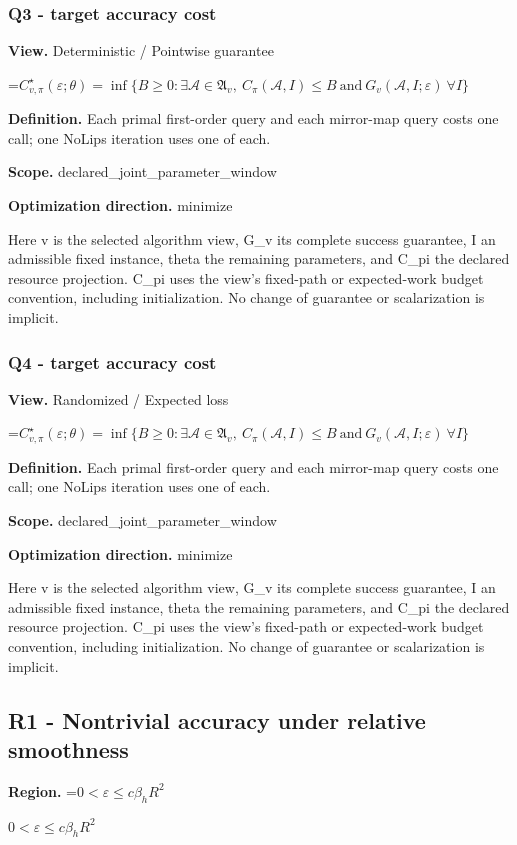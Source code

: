 \documentclass[10pt,a4paper]{article}
\newcommand{\AtlasMath}[1]{\par\begingroup\centering\setbox0=\hbox{$\displaystyle #1$}\ifdim\wd0>1.4\linewidth\typeout{ATLAS WIDE FORMULA: \the\wd0}\fi\ifdim\wd0>\linewidth\resizebox{\linewidth}{!}{\box0}\else\box0\fi\par\endgroup}
\newcommand{\AtlasInlineMath}[1]{\begingroup\setbox0=\hbox{$#1$}\ifdim\wd0>.4\linewidth\endgroup\AtlasMath{#1}\else\endgroup$#1$\fi}
\begin{document}
\subsubsection{Q3 - target accuracy cost}
\textbf{View.} Deterministic / Pointwise guarantee

\AtlasMath{C^\star_{v,\pi}(\varepsilon;\theta)=\inf\{B\ge0:\exists\mathcal A\in\mathfrak A_v,\ C_\pi(\mathcal A,I)\le B\ \text{and}\ G_v(\mathcal A,I;\varepsilon)\ \forall I\}}
\textbf{Definition.} Each primal first-order query and each mirror-map query costs one call; one NoLips iteration uses one of each.

\textbf{Scope.} declared\_joint\_parameter\_window

\textbf{Optimization direction.} minimize

Here v is the selected algorithm view, G\_v its complete success guarantee, I an admissible fixed instance, theta the remaining parameters, and C\_pi the declared resource projection. C\_pi uses the view's fixed-path or expected-work budget convention, including initialization. No change of guarantee or scalarization is implicit.

\subsubsection{Q4 - target accuracy cost}
\textbf{View.} Randomized / Expected loss

\AtlasMath{C^\star_{v,\pi}(\varepsilon;\theta)=\inf\{B\ge0:\exists\mathcal A\in\mathfrak A_v,\ C_\pi(\mathcal A,I)\le B\ \text{and}\ G_v(\mathcal A,I;\varepsilon)\ \forall I\}}
\textbf{Definition.} Each primal first-order query and each mirror-map query costs one call; one NoLips iteration uses one of each.

\textbf{Scope.} declared\_joint\_parameter\_window

\textbf{Optimization direction.} minimize

Here v is the selected algorithm view, G\_v its complete success guarantee, I an admissible fixed instance, theta the remaining parameters, and C\_pi the declared resource projection. C\_pi uses the view's fixed-path or expected-work budget convention, including initialization. No change of guarantee or scalarization is implicit.

\subsection{R1 - Nontrivial accuracy under relative smoothness}
\textbf{Region.} \AtlasInlineMath{0<\varepsilon\le c\beta_hR^2}
\end{document}
